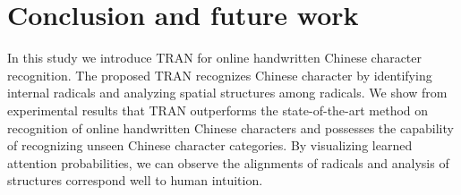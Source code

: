 \documentclass[a4paper,conference]{IEEEtran}
\begin{document}
\section{Conclusion and future work}
\label{sec:Conclusion and future work}
In this study we introduce TRAN for online handwritten Chinese character recognition. The proposed TRAN recognizes Chinese character by identifying internal radicals and analyzing spatial structures among radicals. We show from experimental results that TRAN outperforms the state-of-the-art method on recognition of online handwritten Chinese characters and possesses the capability of recognizing unseen Chinese character categories. By visualizing learned attention probabilities, we can observe the alignments of radicals and analysis of structures correspond well to human intuition.







\end{document}

